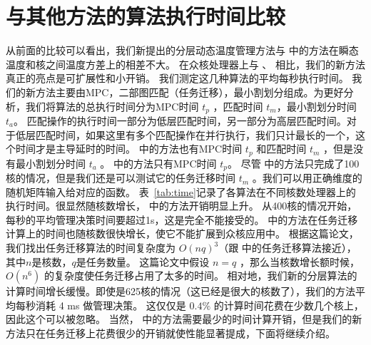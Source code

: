  \section{与其他方法的算法执行时间比较}\label{sec:time_comp}
 
 从前面的比较可以看出，我们新提出的分层动态温度管理方法与 \cite{MaWang:APCCAS'14}中的方法在瞬态温度和核之间温度方差上的相差不大。
 在众核处理器上与 \cite{MaWang:APCCAS'14}、 \cite{Hanumaiah:TCAD'11}相比，我们的新方法真正的亮点是可扩展性和小开销。
 我们测定这几种算法的平均每秒执行时间。
 我们的新方法主要由MPC，二部图匹配（任务迁移），最小割划分组成。为更好分析，我们将算法的总执行时间分为MPC时间 $t_p$ ，匹配时间 $t_m$，最小割划分时间 $t_a$。
 匹配操作的执行时间一部分为低层匹配时间，另一部分为高层匹配时间。对于低层匹配时间，如果这里有多个匹配操作在并行执行，我们只计最长的一个，这个时间才是主导延时的时间。
 \cite{MaWang:APCCAS'14} 中的方法也有MPC时间 $t_p$ 和匹配时间 $t_m$ ，但是没有最小割划分时间 $t_a$ 。
\cite{Zanini:ECCTD'09} 中的方法只有MPC时间 $t_p$。
 尽管 \cite{Hanumaiah:TCAD'11} 中的方法只完成了100核的情况，但是我们还是可以测试它的任务迁移时间 $t_m$ 。我们可以用正确维度的随机矩阵输入给对应的函数。
 表~\ref{tab:time}记录了各算法在不同核数处理器上的执行时间。很显然随核数增长， \cite{MaWang:APCCAS'14} 中的方法开销明显上升。
 从400核的情况开始，每秒的平均管理决策时间要超过1s，这是完全不能接受的。
 \cite{Hanumaiah:TCAD'11} 中的方法在任务迁移计算上的时间也随核数很快增长，使它不能扩展到众核应用中。
 根据这篇论文，我们找出任务迁移算法的时间复杂度为 $O(nq)^3$（跟 \cite{MaWang:APCCAS'14} 中的任务迁移算法接近），其中$n$是核数，$q$是任务数量。
 这篇论文中假设 $n=q$ ，那么当核数增长额时候， $O(n^6)$ 的复杂度使任务迁移占用了太多的时间。
 相对地，我们新的分层算法的计算时间增长缓慢。即使是625核的情况（这已经是很大的核数了），我们的方法平均每秒消耗 4 ms 做管理决策。
 这仅仅是 $0.4\%$ 的计算时间花费在少数几个核上，因此这个可以被忽略。
 当然，\cite{Zanini:ECCTD'09} 中的方法需要最少的时间计算开销，但是我们的新方法只在任务迁移上花费很少的开销就使性能显著提成，下面将继续介绍。
